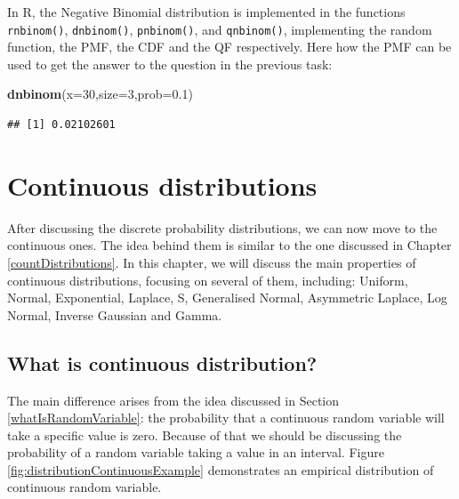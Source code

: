 \documentclass[
]{book}
\newenvironment{Shaded}{\begin{snugshade}}{\end{snugshade}}
\newcommand{\AttributeTok}[1]{\textcolor[rgb]{0.13,0.29,0.53}{#1}}
\newcommand{\DecValTok}[1]{\textcolor[rgb]{0.00,0.00,0.81}{#1}}
\newcommand{\FloatTok}[1]{\textcolor[rgb]{0.00,0.00,0.81}{#1}}
\newcommand{\FunctionTok}[1]{\textcolor[rgb]{0.13,0.29,0.53}{\textbf{#1}}}
\newcommand{\NormalTok}[1]{#1}
\theoremstyle{definition}
\theoremstyle{definition}
\theoremstyle{definition}
\theoremstyle{definition}
\theoremstyle{remark}
\begin{document}
In R, the Negative Binomial distribution is implemented in the functions \texttt{rnbinom()}, \texttt{dnbinom()}, \texttt{pnbinom()}, and \texttt{qnbinom()}, implementing the random function, the PMF, the CDF and the QF respectively. Here how the PMF can be used to get the answer to the question in the previous task:

\begin{Shaded}
\begin{Highlighting}[]
\FunctionTok{dnbinom}\NormalTok{(}\AttributeTok{x=}\DecValTok{30}\NormalTok{,}\AttributeTok{size=}\DecValTok{3}\NormalTok{,}\AttributeTok{prob=}\FloatTok{0.1}\NormalTok{)}
\end{Highlighting}
\end{Shaded}

\begin{verbatim}
## [1] 0.02102601
\end{verbatim}

\chapter{Continuous distributions}\label{distributions}

After discussing the discrete probability distributions, we can now move to the continuous ones. The idea behind them is similar to the one discussed in Chapter \ref{countDistributions}. In this chapter, we will discuss the main properties of continuous distributions, focusing on several of them, including: Uniform, Normal, Exponential, Laplace, S, Generalised Normal, Asymmetric Laplace, Log Normal, Inverse Gaussian and Gamma.

\section{What is continuous distribution?}\label{distributionsContinuousWhat}

The main difference arises from the idea discussed in Section \ref{whatIsRandomVariable}: the probability that a continuous random variable will take a specific value is zero. Because of that we should be discussing the probability of a random variable taking a value in an interval. Figure \ref{fig:distributionContinuousExample} demonstrates an empirical distribution of continuous random variable.
\end{document}
